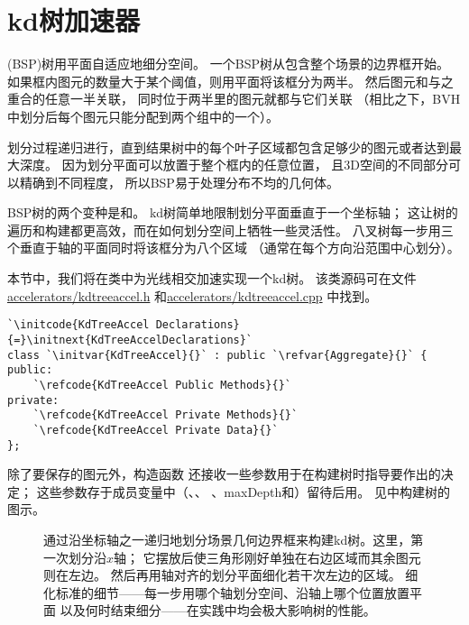 \section{kd树加速器}\label{sec:kd树加速器}

(BSP)树用平面自适应地细分空间。
一个BSP树从包含整个场景的边界框开始。
如果框内图元的数量大于某个阈值，则用平面将该框分为两半。
然后图元和与之重合的任意一半关联，
同时位于两半里的图元就都与它们关联
（相比之下，BVH中划分后每个图元只能分配到两个组中的一个）。

划分过程递归进行，直到结果树中的每个叶子区域都包含足够少的图元或者达到最大深度。
因为划分平面可以放置于整个框内的任意位置，
且3D空间的不同部分可以精确到不同程度，
所以BSP易于处理分布不均的几何体。

BSP树的两个变种是和。
kd树简单地限制划分平面垂直于一个坐标轴；
这让树的遍历和构建都更高效，而在如何划分空间上牺牲一些灵活性。
八叉树每一步用三个垂直于轴的平面同时将该框分为八个区域
（通常在每个方向沿范围中心划分）。

本节中，我们将在类中为光线相交加速实现一个kd树。
该类源码可在文件\href{https://github.com/mmp/pbrt-v3/tree/master/src/accelerators/kdtreeaccel.h}{\ttfamily accelerators/kdtreeaccel.h}
和\href{https://github.com/mmp/pbrt-v3/tree/master/src/accelerators/kdtreeaccel.cpp}{\ttfamily accelerators/kdtreeaccel.cpp}
中找到。

\begin{lstlisting}
`\initcode{KdTreeAccel Declarations}{=}\initnext{KdTreeAccelDeclarations}`
class `\initvar{KdTreeAccel}{}` : public `\refvar{Aggregate}{}` {
public:
    `\refcode{KdTreeAccel Public Methods}{}`
private:
    `\refcode{KdTreeAccel Private Methods}{}`
    `\refcode{KdTreeAccel Private Data}{}`
};
\end{lstlisting}

除了要保存的图元外，构造函数
还接收一些参数用于在构建树时指导要作出的决定；
这些参数存于成员变量中（、、
、{\ttfamily maxDepth}和）留待后用。
见中构建树的图示。
\begin{figure}[htbp]
    \centering
    \caption{通过沿坐标轴之一递归地划分场景几何边界框来构建kd树。这里，第一次划分沿$x$轴；
    它摆放后使三角形刚好单独在右边区域而其余图元则在左边。
    然后再用轴对齐的划分平面细化若干次左边的区域。
    细化标准的细节——每一步用哪个轴划分空间、沿轴上哪个位置放置平面
    以及何时结束细分——在实践中均会极大影响树的性能。}
    \label{fig:4.14}
\end{figure}

